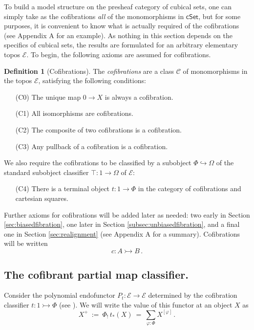 \documentclass[11pt,reqno]{amsart}
\newcommand{\EE}{\ensuremath{\mathcal{E}}}
\newcommand{\cSet}{\ensuremath{\mathsf{cSet}}}
\newcommand{\hook}{\ensuremath{\hookrightarrow}}
\newcommand{\mono}{\ensuremath{\rightarrowtail}}
\renewcommand{\to}{\ensuremath{\rightarrow}}
\theoremstyle{remark}
\theoremstyle{definition}
\newtheorem{definition}[theorem]{Definition}
\begin{document}
To build a model structure on the presheaf category of cubical sets, one can simply take as the cofibrations \emph{all} of the monomorphisms in $\cSet$, but for some purposes, it is convenient to know what is actually required of the cofibrations (see Appendix A for an example).  As nothing in this section depends on the specifics of cubical sets, the results are formulated for an arbitrary elementary topos $\EE$.  To begin, the following axioms are assumed for cofibrations.
 
\begin{definition}[Cofibrations]\label{def:cofibration}
The \emph{cofibrations} are a class $\mathcal{C}$ of monomorphisms in the topos $\EE$, satisfying the following conditions:
\begin{enumerate}
\item[(C0)] The unique map $0\to X$ is always a cofibration.
\item[(C1)] All isomorphisms are cofibrations.
\item[(C2)] The composite of two cofibrations is a cofibration.
\item[(C3)] Any pullback of a cofibration is a cofibration.
\end{enumerate}
We also require the cofibrations to be classified by a subobject $\Phi \hook \Omega$ of the standard subobject classifier $\top: 1 \to \Omega$ of $\EE$:
\begin{enumerate}
\item[(C4)] There is a terminal object $t:1\to\Phi$ in the category of cofibrations and cartesian squares.
\end{enumerate}
Further axioms for cofibrations will be added later as needed: two early in Section \ref{sec:biasedfibration}, one later in Section \ref{subsec:unbiasedfibration}, and a final one in Section \ref{sec:realignment} (see Appendix A %
for a summary).   Cofibrations will be written 
 \[
 c : A \mono B\,.
 \]
\end{definition}

\subsection*{The cofibrant partial map classifier.}
Consider the polynomial endofunctor $P_t : \EE\to \EE$ determined by the cofibration classifier $t : 1 \mono \Phi$ (see  \cite{gambino-kock}).  We will write the value of this functor at an object $X$ as 
\begin{equation}\label{eq:partialmapclassifier}
X^+\ :=\ \Phi_!\,t_*(X)\ =\ \sum_{\varphi: \Phi}X^{[\varphi]}\,.
\end{equation}
\end{document}
